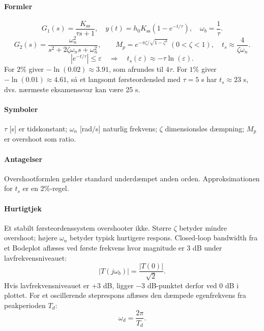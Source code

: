 \paragraph{Formler}
\begin{equation}
\label{eq:first-order-step}
G_1(s)=\frac{K_{\mathrm{ss}}}{\tau s+1},\quad
y(t)=h_0K_{\mathrm{ss}}(1-e^{-t/\tau}),\quad \omega_b=\frac1\tau .
\end{equation}
\begin{equation}
\label{eq:second-order-step}
G_2(s)=\frac{\omega_n^2}{s^2+2\zeta\omega_ns+\omega_n^2},\qquad
M_p=e^{-\pi\zeta/\sqrt{1-\zeta^2}}\ (0<\zeta<1),\quad
t_s\approx\frac4{\zeta\omega_n}.
\end{equation}
\begin{equation}
\label{eq:settling-band}
|e^{-t/\tau}|\leq \varepsilon
\quad\Rightarrow\quad
t_s(\varepsilon)\approx -\tau\ln(\varepsilon).
\end{equation}
For \(2\%\) giver \(-\ln(0.02)\approx3.91\), som afrundes til \(4\tau\). For \(1\%\)
giver \(-\ln(0.01)\approx4.61\), så et langsomt førsteordensled med
\(\tau=5\) s har \(t_s\approx23\) s, dvs. nærmeste eksamenssvar kan være 25 s.

\paragraph{Symboler}
\(\tau\) [s] er tidskonstant; \(\omega_n\) [rad/s] naturlig frekvens;
\(\zeta\) dimensionsløs dæmpning; \(M_p\) er overshoot som ratio.

\paragraph{Antagelser}
Overshootformlen gælder standard underdæmpet anden orden. Approksimationen for
\(t_s\) er en 2\%-regel.

\paragraph{Hurtigtjek}
Et stabilt førsteordenssystem overshooter ikke. Større \(\zeta\) betyder mindre
overshoot; højere \(\omega_n\) betyder typisk hurtigere respons.
Closed-loop bandwidth fra et Bodeplot aflæses ved første frekvens hvor magnitude er
3 dB under lavfrekvensniveauet:
\[
|T(j\omega_b)|=\frac{|T(0)|}{\sqrt2}.
\]
Hvis lavfrekvensniveauet er \(+3\) dB, ligger \(-3\) dB-punktet derfor ved 0 dB i
plottet. For et oscillerende steprespons aflæses den dæmpede egenfrekvens fra
peakperioden \(T_d\):
\[
\omega_d=\frac{2\pi}{T_d}.
\]


